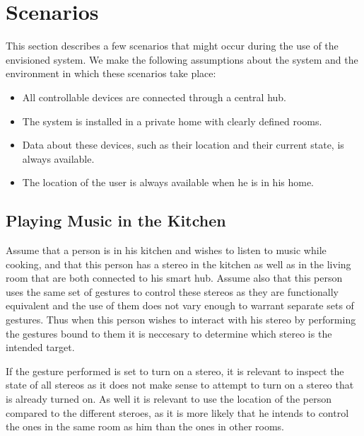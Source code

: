 \section{Scenarios}
\label{sec:analysis:scenarios}


This section describes a few scenarios that might occur during the use of the envisioned system. We make the following assumptions about the system and the environment in which these scenarios take place:

\begin{itemize}
    \item All controllable devices are connected through a central hub.
    \item The system is installed in a private home with clearly defined rooms.
    \item Data about these devices, such as their location and their current state, is always available.
    \item The location of the user is always available when he is in his home.
\end{itemize}

\subsection{Playing Music in the Kitchen}
\label{sec:analysis:scenarios:playing_music}

Assume that a person is in his kitchen and wishes to listen to music while cooking, and that this person has a stereo in the kitchen as well as in the living room that are both connected to his smart hub.
Assume also that this person uses the same set of gestures to control these stereos as they are functionally equivalent and the use of them does not vary enough to warrant separate sets of gestures.
Thus when this person wishes to interact with his stereo by performing the gestures bound to them it is neccesary to determine which stereo is the intended target.

If the gesture performed is set to turn on a stereo, it is relevant to inspect the state of all stereos as it does not make sense to attempt to turn on a stereo that is already turned on.
As well it is relevant to use the location of the person compared to the different steroes, as it is more likely that he intends to control the ones in the same room as him than the ones in other rooms.

